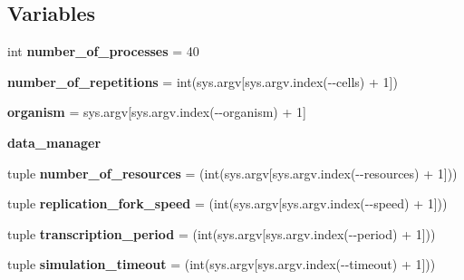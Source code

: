 \subsection*{Variables}
\begin{DoxyCompactItemize}
\item 
\mbox{\label{namespaceReDyMo_1_1src_1_1main_a3e461bf547cd1bebd8e5f31317c84fb2}} 
int {\bfseries number\+\_\+of\+\_\+processes} = 40
\item 
\mbox{\label{namespaceReDyMo_1_1src_1_1main_a1572de96581b3f9ec2c841c1ce035bda}} 
{\bfseries number\+\_\+of\+\_\+repetitions} = int(sys.\+argv\mbox{[}sys.\+argv.\+index(\textquotesingle{}-\/-\/cells\textquotesingle{}) + 1\mbox{]})
\item 
\mbox{\label{namespaceReDyMo_1_1src_1_1main_a9a7894208cd3d0d09e8be8b4803b937e}} 
{\bfseries organism} = sys.\+argv\mbox{[}sys.\+argv.\+index(\textquotesingle{}-\/-\/organism\textquotesingle{}) + 1\mbox{]}
\item 
{\bfseries data\+\_\+manager}
\item 
\mbox{\label{namespaceReDyMo_1_1src_1_1main_a06b81257c39075427ab714f98a7e0fa9}} 
tuple {\bfseries number\+\_\+of\+\_\+resources} = (int(sys.\+argv\mbox{[}sys.\+argv.\+index(\textquotesingle{}-\/-\/resources\textquotesingle{}) + 1\mbox{]}))
\item 
\mbox{\label{namespaceReDyMo_1_1src_1_1main_a2aa6eece972b65d9f2a9b6fa7fd1f6bf}} 
tuple {\bfseries replication\+\_\+fork\+\_\+speed} = (int(sys.\+argv\mbox{[}sys.\+argv.\+index(\textquotesingle{}-\/-\/speed\textquotesingle{}) + 1\mbox{]}))
\item 
\mbox{\label{namespaceReDyMo_1_1src_1_1main_a847f84d09954d34f68cff0d738f83760}} 
tuple {\bfseries transcription\+\_\+period} = (int(sys.\+argv\mbox{[}sys.\+argv.\+index(\textquotesingle{}-\/-\/period\textquotesingle{}) + 1\mbox{]}))
\item 
\mbox{\label{namespaceReDyMo_1_1src_1_1main_a4771a9b59eba686cdb5d855aa8803d6f}} 
tuple {\bfseries simulation\+\_\+timeout} = (int(sys.\+argv\mbox{[}sys.\+argv.\+index(\textquotesingle{}-\/-\/timeout\textquotesingle{}) + 1\mbox{]}))

\end{DoxyCompactItemize}
